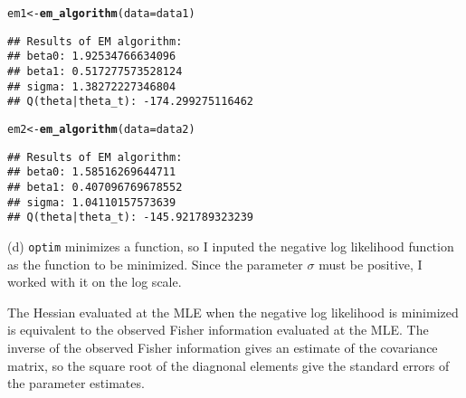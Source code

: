 \documentclass{article}\usepackage[]{graphicx}\usepackage[]{color}
\makeatletter
\newcommand{\hlstd}[1]{\textcolor[rgb]{0.345,0.345,0.345}{#1}}%
\newcommand{\hlkwb}[1]{\textcolor[rgb]{0.69,0.353,0.396}{#1}}%
\newcommand{\hlkwc}[1]{\textcolor[rgb]{0.333,0.667,0.333}{#1}}%
\newcommand{\hlkwd}[1]{\textcolor[rgb]{0.737,0.353,0.396}{\textbf{#1}}}%
\newenvironment{kframe}{%
 \def\at@end@of@kframe{}%
 \ifinner\ifhmode%
  \def\at@end@of@kframe{\end{minipage}}%
  \begin{minipage}{\columnwidth}%
 \fi\fi%
 \def\FrameCommand##1{\hskip\@totalleftmargin \hskip-\fboxsep
 \colorbox{shadecolor}{##1}\hskip-\fboxsep
     \hskip-\linewidth \hskip-\@totalleftmargin \hskip\columnwidth}%
 \MakeFramed {\advance\hsize-\width
   \@totalleftmargin\z@ \linewidth\hsize
   \@setminipage}}%
 {\par\unskip\endMakeFramed%
 \at@end@of@kframe}
\newenvironment{knitrout}{}{} %
\makeatother
\begin{document}
\begin{knitrout}
\begin{kframe}
\begin{alltt}
\hlstd{em1} \hlkwb{<-} \hlkwd{em_algorithm}\hlstd{(}\hlkwc{data} \hlstd{= data1)}
\end{alltt}
\begin{verbatim}
## Results of EM algorithm:
## beta0: 1.92534766634096
## beta1: 0.517277573528124
## sigma: 1.38272227346804
## Q(theta|theta_t): -174.299275116462
\end{verbatim}
\begin{alltt}
\hlstd{em2} \hlkwb{<-} \hlkwd{em_algorithm}\hlstd{(}\hlkwc{data} \hlstd{= data2)}
\end{alltt}
\begin{verbatim}
## Results of EM algorithm:
## beta0: 1.58516269644711
## beta1: 0.407096769678552
## sigma: 1.04110157573639
## Q(theta|theta_t): -145.921789323239
\end{verbatim}
\end{kframe}
\end{knitrout}

(d)
\texttt{optim} minimizes a function, so I inputed the negative log likelihood function as the function to be minimized. Since the parameter $\sigma$ must be positive, I worked with it on the log scale.

The Hessian evaluated at the MLE when the negative log likelihood is minimized is equivalent to the observed Fisher information evaluated at the MLE. The inverse of the observed Fisher information gives an estimate of the covariance matrix, so the square root of the diagnonal elements give the standard errors of the parameter estimates.
\end{document}
